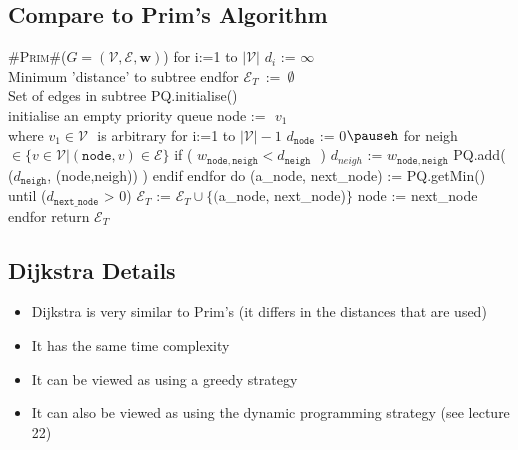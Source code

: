 \begin{slide}
\section[-2.4]{Compare to Prim's Algorithm}

\begin{pseudo}
#\textsc{Prim}#($G=(\mathcal{V},\mathcal{E},\bm{w})$) {
   for i:=1 to $|\mathcal{V}|$
      $d_i$ := $\infty$               \\ Minimum 'distance' to subtree
   endfor
   $\mathcal{E}_T\,$ := $\,\emptyset$                  \\ Set of edges in subtree
   PQ.initialise()       \\ initialise an empty priority queue
   node := $\,\,v_1$              \\ where $v_1\in\mathcal{V}\,\,$ is arbitrary
   for i:=1 to $|\mathcal{V}|-1$
      $d_{\mathtt{node}}$ := 0$\pauseh$
      for neigh $\in \{v\in\mathcal{V}| (\mathtt{node},v)\in\mathcal{E}\}$
         if ( $w_{\mathtt{node,neigh}} < d_{\mathtt{neigh}}\,\,$  )
            $d_{neigh}$ := $w_{\mathtt{node,neigh}}$
            PQ.add( ($d_{\mathtt{neigh}}$, (node,neigh)) )
         endif
      endfor
      do
         (a_node, next_node) := PQ.getMin()
      until ($d_{\mathtt{next\_node}}$  > 0)
      $\mathcal{E}_T$ := $\mathcal{E}_T \cup \{($a_node, next_node)$\}$
      node := next_node
   endfor
   return $\mathcal{E}_T$
}
\end{pseudo}
\vspace*{-1cm}
\end{slide}


\begin{slide}
\section{Dijkstra Details}

\begin{PauseHighLight}
  \begin{itemize}
  \item Dijkstra is very similar to Prim's (it differs in the distances
    that are used)\pause
  \item It has the same time complexity\pause
  \item It can be viewed as using a greedy strategy\pause
  \item It can also be viewed as using the dynamic programming strategy
    (see lecture 22)\pause
  \end{itemize}
\end{PauseHighLight}

\end{slide}

